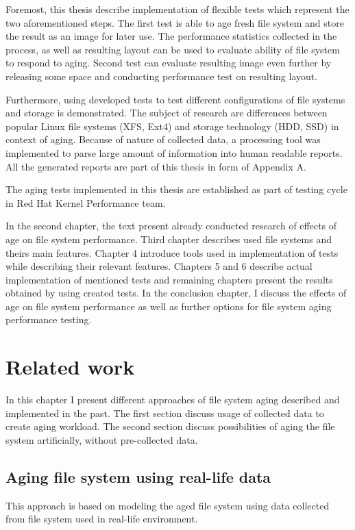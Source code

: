 \documentclass[
  color, %
  table, %
  lof,   %
  lot,   %
]{fithesis3}
\begin{document}
Foremost, this thesis describe implementation of flexible tests which represent the two aforementioned steps. The first test is able to age fresh file system and store the result as an image for later use. The performance statistics collected in the process, as well as resulting layout can be used to evaluate ability of file system to respond to aging. Second test can evaluate resulting image even further by releasing some space and conducting performance test on resulting layout. 

Furthermore, using developed tests to test different configurations of file systems and storage is demonstrated. The subject of research are differences between popular Linux file systems (XFS, Ext4) and storage technology (HDD, SSD) in context of aging. Because of nature of collected data, a processing tool was implemented to parse large amount of information into human readable reports. All the generated reports are part of this thesis in form of Appendix A.

The aging tests implemented in this thesis are established as part of testing cycle in Red Hat Kernel Performance team.

In the second chapter, the text present already conducted research of effects of age on file system performance. Third chapter describes used file systems and theirs main features. Chapter 4 introduce tools used in implementation of tests while describing their relevant features. Chapters 5 and 6 describe actual implementation of mentioned tests and remaining chapters present the results obtained by using created tests. In the conclusion chapter, I discuss the effects of age on file system performance as well as further options for file system aging performance testing.

\chapter{Related work}
In this chapter I present different approaches of file system aging described and implemented in the past. The first section discuss usage of collected data to create aging workload. The second section discuss possibilities of aging the file system artificially, without pre-collected data.

\section{Aging file system using real-life data}
This approach is based on modeling the aged file system using data collected from file system used in real-life environment.
\end{document}
